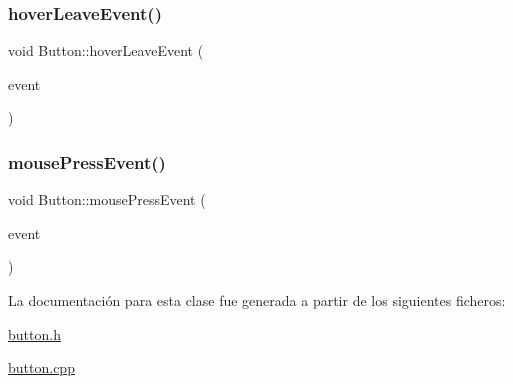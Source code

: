 \subsubsection{\texorpdfstring{hover\+Leave\+Event()}{hoverLeaveEvent()}}
{\footnotesize\ttfamily void Button\+::hover\+Leave\+Event (\begin{DoxyParamCaption}\item[{Q\+Graphics\+Scene\+Hover\+Event $\ast$}]{event }\end{DoxyParamCaption})}

\hypertarget{class_button_a17d8eb0c904605b223bbc00c75655315}{}\label{class_button_a17d8eb0c904605b223bbc00c75655315} 
\subsubsection{\texorpdfstring{mouse\+Press\+Event()}{mousePressEvent()}}
{\footnotesize\ttfamily void Button\+::mouse\+Press\+Event (\begin{DoxyParamCaption}\item[{Q\+Graphics\+Scene\+Mouse\+Event $\ast$}]{event }\end{DoxyParamCaption})}



La documentación para esta clase fue generada a partir de los siguientes ficheros\+:\begin{DoxyCompactItemize}
\item 
\hyperlink{button_8h}{button.\+h}\item 
\hyperlink{button_8cpp}{button.\+cpp}\end{DoxyCompactItemize}
